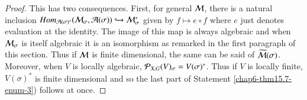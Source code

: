 \begin{proof}
This has two consequences. First, for general $\mathcal{M}$, there is a natural inclusion $Hom_{\mathcal{A}(\sigma)^{*}}(\mathcal{M}_{\sigma}, \mathcal{A}(\sigma)) \hookrightarrow \mathcal{M}_{\sigma}^{*}$ given by $f \mapsto e \circ f$ where $e$ just denotes evaluation at the identity. The image of this map is always algebraic and when $\mathcal{M}_{\sigma}$ is itself algebraic it is an isomorphism as remarked in the first  paragraph of this section. Thus if $\mathcal{M}$ is finite dimensional, the same can be said of $\widetilde{\mathcal{M}}(\sigma)$. Moreover, when $V$ is locally algebraic, $\mathcal{P}_{X, G}(V)_{\sigma} = V(\sigma)^{*}$. Thus if $V$ is locally finite, $V(\sigma)^{*}$ is finite dimensional and so the last part of Statement \ref{chap6-thm15.7-enum-3}) follows at once.
\end{proof}

\newpage

